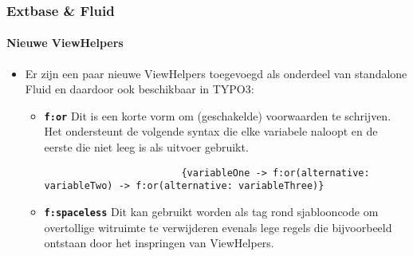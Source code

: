 \begin{frame}[fragile]
	\frametitle{Extbase \& Fluid}
	\framesubtitle{Nieuwe ViewHelpers}

	\lstset{basicstyle=\tiny\ttfamily}

	\begin{itemize}
		\item Er zijn een paar nieuwe ViewHelpers toegevoegd als onderdeel van standalone Fluid
			en daardoor ook beschikbaar in TYPO3:

			\begin{itemize}

				\item \textbf{\texttt{f:or}}\newline
					Dit is een korte vorm om (geschakelde) voorwaarden te schrijven.
					Het ondersteunt de volgende syntax die elke variabele naloopt en
					de eerste die niet leeg is als uitvoer gebruikt.

					\begin{lstlisting}
						{variableOne -> f:or(alternative: variableTwo) -> f:or(alternative: variableThree)}
					\end{lstlisting}

				\item \textbf{\texttt{f:spaceless}}\newline
					Dit kan gebruikt worden als tag rond sjablooncode om
					overtollige witruimte te verwijderen evenals lege regels
					die bijvoorbeeld ontstaan door het inspringen van ViewHelpers.

			\end{itemize}

	\end{itemize}

\end{frame}


